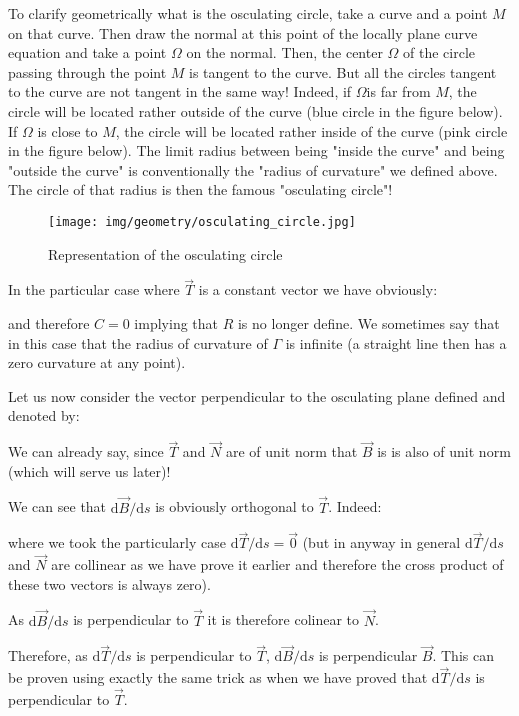 {	To clarify geometrically what is the osculating circle, take a curve and a point $M$ on that curve. Then draw the normal at this point of the locally plane curve equation and take a point $\Omega$ on the normal. Then, the center $\Omega$ of the circle passing through the point $M$ is tangent to the curve. But all the circles tangent to the curve are not tangent in the same way! Indeed, if $\Omega $is far from $M$, the circle will be located rather outside of the curve (blue circle in the figure below). If $\Omega$ is close to $M$, the circle will be located rather inside of the curve (pink circle in the figure below). The limit radius between being "inside the curve" and being "outside the curve" is conventionally the "radius of curvature" we defined above. The circle of that radius is then the famous "osculating circle"!
	\begin{figure}[H]
		\centering
		\texttt{[image: img/geometry/osculating\_circle.jpg]}
		\caption{Representation of the osculating circle}
	\end{figure}
	In the particular case where $\vec{T}$ is a constant vector we have obviously:
	
	and therefore $C=0$ implying that $R$ is no longer define. We sometimes say that in this case that the radius of curvature  of $\Gamma$ is infinite (a straight line then has a zero curvature at any point).
	
	Let us now consider the vector perpendicular to the osculating plane defined and denoted by:
	
	We can already say, since $\vec{T}$ and $\vec{N}$ are of unit norm that $\vec{B}$ is is also of unit norm (which will serve us later)!
	
	We can see that $\mathrm{d}\vec{B}/\mathrm{d}s$ is obviously orthogonal to $\vec{T}$. Indeed:
	
	where we took the particularly case $\mathrm{d}\vec{T}/\mathrm{d}s=\vec{0}$  (but in anyway in general $\mathrm{d}\vec{T}/\mathrm{d}s$ and $\vec{N}$ are collinear as we have prove it earlier and therefore the cross product of these two vectors is always zero).
	
	As $\mathrm{d}\vec{B}/\mathrm{d}s$ is perpendicular to $\vec{T}$ it is therefore colinear to $\vec{N}$.
	
	Therefore, as $\mathrm{d}\vec{T}/\mathrm{d}s$ is perpendicular to $\vec{T}$, $\mathrm{d}\vec{B}/\mathrm{d}s$ is perpendicular $\vec{B}$. This can be proven using exactly the same trick as when we have proved that $\mathrm{d}\vec{T}/\mathrm{d}s$ is perpendicular to $\vec{T}$.
	
}
